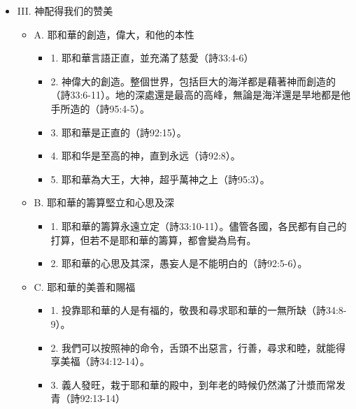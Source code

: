 \begin{itemize}
\begin{itemize}
\item C.	知道神會救護我們（詩20:6）。在遭難的日子，祈求和讚美，會驅除內心的恐懼，反而領悟到神會救護我們，心裡就會有盼望。雖然在困苦窮乏中，稱頌耶和華的名為大，但相信神依然顧念我（詩40:17）。
\item D.	仰望耶和華必不蒙羞（詩34:5）。一個曾經風光一時的大衛王，此時要裝瘋賣傻，但是因為讚美就對神有了仰望，內心就不會蒙羞。
\item E.	感恩珍惜自己上帝儿女的身份
\begin{itemize}
\item 1.	我们是耶和华草场的羊，是耶和华手下的民（詩95:7）。
\item 2.	耶和华高举了我们的角，我们是被新油膏的（诗92:10）。
\end{itemize}
\end{itemize}
\item III.	神配得我们的赞美
\begin{itemize}
\item A.	耶和華的創造，偉大，和他的本性
\begin{itemize}
\item 1.	耶和華言語正直，並充滿了慈愛（詩33:4-6）
\item 2.	神偉大的創造。整個世界，包括巨大的海洋都是藉著神而創造的（詩33:6-11）。地的深處還是最高的高峰，無論是海洋還是旱地都是他手所造的（詩95:4-5）。
\item 3.	耶和華是正直的（詩92:15）。
\item 4.	耶和华是至高的神，直到永远（诗92:8）。
\item 5.	耶和華為大王，大神，超乎萬神之上（詩95:3）。
\end{itemize}
\item B.	耶和華的籌算堅立和心思及深
\begin{itemize}
\item 1.	耶和華的籌算永遠立定（詩33:10-11）。儘管各國，各民都有自己的打算，但若不是耶和華的籌算，都會變為烏有。
\item 2.	耶和華的心思及其深，愚妄人是不能明白的（詩92:5-6）。
\end{itemize}
\item C.	耶和華的美善和賜福
\begin{itemize}
\item 1.	投靠耶和華的人是有福的，敬畏和尋求耶和華的一無所缺（詩34:8-9）。
\item 2.	我們可以按照神的命令，舌頭不出惡言，行善，尋求和睦，就能得享美福（詩34:12-14）。
\item 3.	義人發旺，栽于耶和華的殿中，到年老的時候仍然滿了汁漿而常发青（詩92:13-14）

\end{itemize}
\end{itemize}
\end{itemize}
